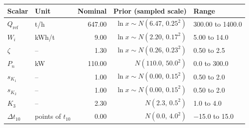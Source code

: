 \begin{tabular}{@{}llrrl@{}}
\toprule
Scalar & Unit & Nominal & Prior (sampled scale) & Range \\
\midrule
$Q_{\mathrm{ref}}$ & t/h & 647.00 & $\ln x \sim N(6.47,\,0.25^2)$ & 300.00 to 1400.0 \\
$W_i$ & kWh/t & 9.00 & $\ln x \sim N(2.20,\,0.17^2)$ & 5.00 to 14.0 \\
$\zeta$ & -- & 1.30 & $\ln x \sim N(0.26,\,0.23^2)$ & 0.50 to 2.5 \\
$P_n$ & kW & 110.00 & $N(110.0,\,50.0^2)$ & 0.0 to 300.0 \\
$s_{K_1}$ & -- & 1.00 & $\ln x \sim N(0.00,\,0.15^2)$ & 0.50 to 2.0 \\
$s_{K_2}$ & -- & 1.00 & $\ln x \sim N(0.00,\,0.15^2)$ & 0.50 to 2.0 \\
$K_3$ & -- & 2.30 & $N(2.3,\,0.5^2)$ & 1.0 to 4.0 \\
$\Delta t_{10}$ & points of $t_{10}$ & 0.00 & $N(0.0,\,4.0^2)$ & $-$15.0 to 15.0 \\
\bottomrule
\end{tabular}
